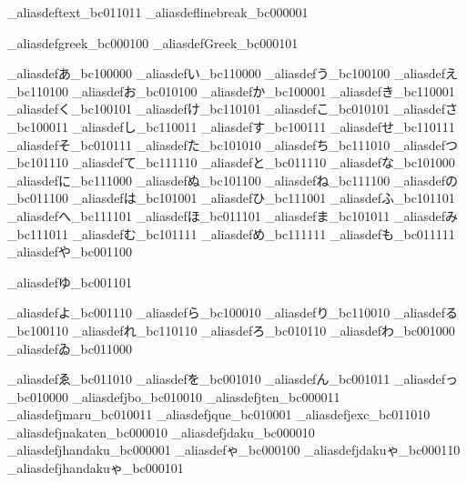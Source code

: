 \brl@char_aliasdef{text}{\brl@char_bc011011}
\brl@char_aliasdef{linebreak}{\brl@char_bc000001}

\brl@char_aliasdef{greek}{\brl@char_bc000100}
\brl@char_aliasdef{Greek}{\brl@char_bc000101}

\brl@char_aliasdef{あ}{\brl@char_bc100000}
\brl@char_aliasdef{い}{\brl@char_bc110000}
\brl@char_aliasdef{う}{\brl@char_bc100100}
\brl@char_aliasdef{え}{\brl@char_bc110100}
\brl@char_aliasdef{お}{\brl@char_bc010100}
\brl@char_aliasdef{か}{\brl@char_bc100001}
\brl@char_aliasdef{き}{\brl@char_bc110001}
\brl@char_aliasdef{く}{\brl@char_bc100101}
\brl@char_aliasdef{け}{\brl@char_bc110101}
\brl@char_aliasdef{こ}{\brl@char_bc010101}
\brl@char_aliasdef{さ}{\brl@char_bc100011}
\brl@char_aliasdef{し}{\brl@char_bc110011}
\brl@char_aliasdef{す}{\brl@char_bc100111}
\brl@char_aliasdef{せ}{\brl@char_bc110111}
\brl@char_aliasdef{そ}{\brl@char_bc010111}
\brl@char_aliasdef{た}{\brl@char_bc101010}
\brl@char_aliasdef{ち}{\brl@char_bc111010}
\brl@char_aliasdef{つ}{\brl@char_bc101110}
\brl@char_aliasdef{て}{\brl@char_bc111110}
\brl@char_aliasdef{と}{\brl@char_bc011110}
\brl@char_aliasdef{な}{\brl@char_bc101000}
\brl@char_aliasdef{に}{\brl@char_bc111000}
\brl@char_aliasdef{ぬ}{\brl@char_bc101100}
\brl@char_aliasdef{ね}{\brl@char_bc111100}
\brl@char_aliasdef{の}{\brl@char_bc011100}
\brl@char_aliasdef{は}{\brl@char_bc101001}
\brl@char_aliasdef{ひ}{\brl@char_bc111001}
\brl@char_aliasdef{ふ}{\brl@char_bc101101}
\brl@char_aliasdef{へ}{\brl@char_bc111101}
\brl@char_aliasdef{ほ}{\brl@char_bc011101}
\brl@char_aliasdef{ま}{\brl@char_bc101011}
\brl@char_aliasdef{み}{\brl@char_bc111011}
\brl@char_aliasdef{む}{\brl@char_bc101111}
\brl@char_aliasdef{め}{\brl@char_bc111111}
\brl@char_aliasdef{も}{\brl@char_bc011111}
\brl@char_aliasdef{や}{\brl@char_bc001100}

\brl@char_aliasdef{ゆ}{\brl@char_bc001101}

\brl@char_aliasdef{よ}{\brl@char_bc001110}
\brl@char_aliasdef{ら}{\brl@char_bc100010}
\brl@char_aliasdef{り}{\brl@char_bc110010}
\brl@char_aliasdef{る}{\brl@char_bc100110}
\brl@char_aliasdef{れ}{\brl@char_bc110110}
\brl@char_aliasdef{ろ}{\brl@char_bc010110}
\brl@char_aliasdef{わ}{\brl@char_bc001000}
\brl@char_aliasdef{ゐ}{\brl@char_bc011000}

\brl@char_aliasdef{ゑ}{\brl@char_bc011010}
\brl@char_aliasdef{を}{\brl@char_bc001010}
\brl@char_aliasdef{ん}{\brl@char_bc001011}
\brl@char_aliasdef{っ}{\brl@char_bc010000}
\brl@char_aliasdef{jbo}{\brl@char_bc010010}
\brl@char_aliasdef{jten}{\brl@char_bc000011}
\brl@char_aliasdef{jmaru}{\brl@char_bc010011}
\brl@char_aliasdef{jque}{\brl@char_bc010001}
\brl@char_aliasdef{jexc}{\brl@char_bc011010}
\brl@char_aliasdef{jnakaten}{\brl@char_bc000010}
\brl@char_aliasdef{jdaku}{\brl@char_bc000010}
\brl@char_aliasdef{jhandaku}{\brl@char_bc000001}
\brl@char_aliasdef{ゃ}{\brl@char_bc000100}
\brl@char_aliasdef{jdakuゃ}{\brl@char_bc000110}
\brl@char_aliasdef{jhandakuゃ}{\brl@char_bc000101}

